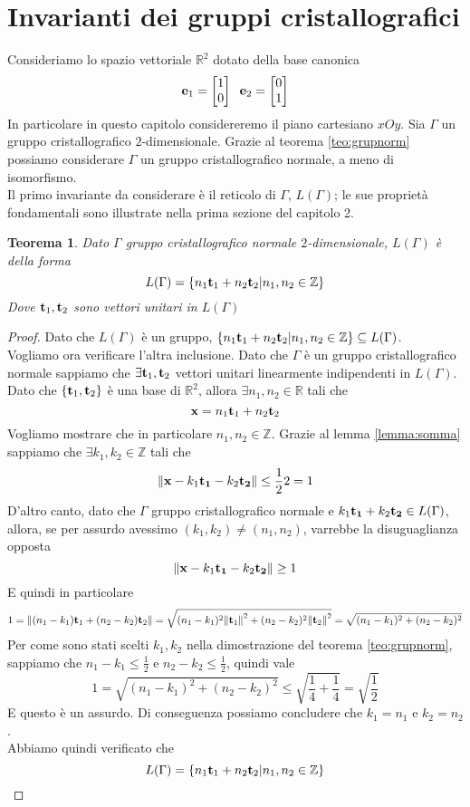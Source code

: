 \documentclass[a4paper,11pt,openright,twoside	]{book}
\newtheorem{theorem}{Teorema}[section]
\begin{document}
\section{Invarianti dei gruppi cristallografici}
Consideriamo lo spazio vettoriale $\mathbb{R}^2$ dotato della base canonica
\[ \vb{e}_1 = \begin{bmatrix}{}
1 \\ 
0 \\
\end{bmatrix} \; \; \vb{e}_2 = \begin{bmatrix}{}
0 \\ 
1 \\
\end{bmatrix}\]
In particolare in questo capitolo considereremo il piano cartesiano $xOy$. 
Sia $\Gamma$ un gruppo cristallografico $2$-dimensionale. 
Grazie al teorema \ref{teo:grupnorm} possiamo considerare $\Gamma$ un gruppo cristallografico normale, a meno di isomorfismo. \\
Il primo invariante da considerare è il reticolo di $\Gamma$, $L(\Gamma)$; le sue proprietà fondamentali sono illustrate nella prima sezione del capitolo 2. 
\begin{theorem}
Dato $\Gamma$ gruppo cristallografico normale $2$-dimensionale, $L(\Gamma)$ è della forma
\[ L(\Gamma) = \{ n_1 \vb{t}_1 + n_2 \vb{t}_2  | n_1, n_2 \in \mathbb{Z} \} \]
Dove $\vb{t}_1, \vb{t}_2$ sono vettori unitari in $L(\Gamma)$
\end{theorem}
\begin{proof}
Dato che $L(\Gamma)$ è un gruppo, $\{ n_1 \vb{t}_1 + n_2 \vb{t}_2  | n_1, n_2 \in \mathbb{Z} \} \subseteq L(\Gamma)$. \\
Vogliamo ora verificare l'altra inclusione.
Dato che $\Gamma$ è un gruppo cristallografico normale sappiamo che $\exists \vb{t}_1, \vb{t}_2$ vettori unitari linearmente indipendenti in $L(\Gamma)$. Dato che $\{ \vb{t}_1, \vb{t}_2 \}$ è una base di $\mathbb{R}^2$, allora $\exists n_1, n_2 \in \mathbb{R}$ tali che 
\[ \vb{x} = n_1 \vb{t}_1 + n_2 \vb{t}_2 \]
Vogliamo mostrare che in particolare $n_1, n_2 \in \mathbb{Z}$. Grazie al lemma \ref{lemma:somma} sappiamo che $\exists k_1, k_2 \in \mathbb{Z}$ tali che 
\[ \norm{\vb{x} - k_1 \vb{t_1} - k_2 \vb{t_2}} \leq \frac{1}{2}2 = 1\]
D'altro canto, dato che $\Gamma$ gruppo cristallografico normale e $k_1 \vb{t_1} + k_2 \vb{t_2} \in L(\Gamma)$, allora, se per assurdo avessimo $( k_1 , k_2) \neq (n_1, n_2)$, varrebbe la disuguaglianza opposta
\[ \norm{\vb{x} - k_1 \vb{t_1} - k_2 \vb{t_2}} \geq 1\] 
E quindi in particolare 
\[ 1 = \norm{ (n_1- k_1) \vb{t}_1 + (n_2- k_2) \vb{t}_2} = \sqrt{(n_1- k_1)^2 \norm{\vb{t}_1 }^2+ (n_2- k_2)^2 \norm{\vb{t}_2}^2 } = \sqrt{(n_1- k_1)^2 + (n_2- k_2)^2 }\]
Per come sono stati scelti $k_1, k_2$ nella dimostrazione del teorema \ref{teo:grupnorm}, sappiamo che $n_1 - k_1 \leq \frac{1}{2}$ e $n_2 - k_2 \leq \frac{1}{2}$, quindi vale 
\[ 1 = \sqrt{(n_1- k_1)^2 + (n_2- k_2)^2 } \leq \sqrt{\frac{1}{4} + \frac{1}{4}} = \sqrt{\frac{1}{2}}\]
E questo è un assurdo. Di conseguenza possiamo concludere che $k_1 = n_1$ e $k_2 = n_2$. \\
Abbiamo quindi verificato che 
\[ L(\Gamma) = \{ n_1 \vb{t}_1 + n_2 \vb{t}_2  | n_1, n_2 \in \mathbb{Z} \} \]
\end{proof}
\end{document}
